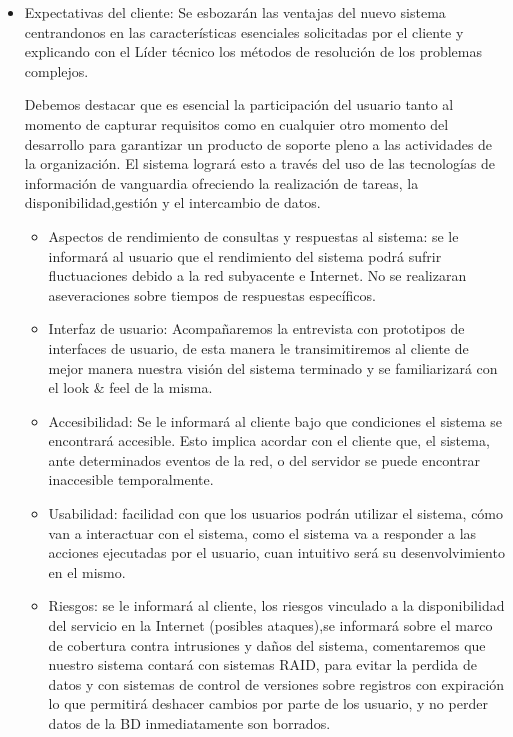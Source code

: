 \begin{itemize}
	\item Expectativas del cliente:	Se esbozarán las ventajas del nuevo sistema centrandonos en las características esenciales solicitadas por el cliente y explicando con el Líder técnico los métodos de resolución de los problemas complejos.
    
	Debemos destacar que es esencial la participación del usuario tanto al momento de capturar requisitos como en cualquier otro momento del desarrollo para garantizar un producto de soporte pleno a las actividades de la organización.
    El sistema logrará esto a través del uso de las tecnologías de información de vanguardia ofreciendo la realización de tareas, la disponibilidad,gestión y el intercambio de datos.
    \begin{itemize}
		\item Aspectos de rendimiento de consultas y respuestas al sistema: se le informará al usuario que el rendimiento del sistema podrá sufrir fluctuaciones debido a la red subyacente e Internet.
No se realizaran aseveraciones sobre tiempos de respuestas específicos.

		\item Interfaz de usuario: Acompañaremos la entrevista con prototipos de interfaces de usuario, de esta manera le transimitiremos al cliente de mejor manera nuestra visión del sistema terminado y se familiarizará con el look \& feel de la misma.

		\item Accesibilidad: Se le informará al cliente bajo que condiciones el sistema se encontrará accesible.
        Esto implica acordar con el cliente que, el sistema, ante determinados eventos de la red, o del servidor se puede encontrar inaccesible temporalmente.
        
        \item Usabilidad: facilidad con que los usuarios podrán utilizar el sistema, cómo van a interactuar con el sistema, como el sistema va a responder a las acciones ejecutadas por el usuario, cuan intuitivo será su desenvolvimiento en el mismo.

		\item Riesgos: se le informará al cliente, los riesgos vinculado a la disponibilidad del servicio en la Internet (posibles ataques),se informará sobre el marco de cobertura contra intrusiones y daños del sistema, comentaremos que nuestro sistema contará con sistemas RAID, para evitar la perdida de datos y con sistemas de control de versiones sobre registros con expiración lo que permitirá deshacer cambios por parte de los usuario, y no perder datos de la BD inmediatamente son borrados.
	\end{itemize}


\end{itemize}
